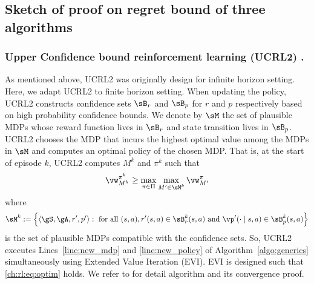 \subsection{Sketch of proof on regret bound of three algorithms}

\subsubsection{Upper Confidence bound reinforcement learning (UCRL2) \texorpdfstring{\cite{jaksch2010near}}{[JAO10]}.}
As mentioned above, UCRL2 was originally design for infinite horizon setting.
Here, we adapt UCRL2 to finite horizon setting.
When updating the policy, UCRL2 constructs confidence sets $\sB_r$ and $\sB_p$ for $r$ and $p$ respectively based on high probability confidence bounds.
We denote by $\sM$ the set of plausible MDPs whose reward function lives in $\sB_r$ and state transition lives in $\sB_p$.
UCRL2 chooses the MDP that incurs the highest optimal value among the MDPs in $\sM$ and computes an optimal policy of the chosen MDP.
That is, at the start of episode $k$, UCRL2 computes $M^k$ and $\pi^k$ such that
\begin{equation}
    \label{ch:rl:eq:optim}
    \vw_{M^k}^{\pi^k} \ge \max_{\pi\in\Pi}\max_{M'\in\sM^k} \vw_{M'}^\pi
\end{equation}
where
\begin{align*}
    \sM^k:=\Big\{\langle\gS,\gA,r',p'\rangle :
    \text{ for all }(s,a), r'(s,a)\in\sB_r^k(s,a) \text{ and } \vp'(\cdot\mid s,a)\in\sB_p^k(s,a)\Big\}
\end{align*}
is the set of plausible MDPs compatible with the confidence sets.
So, UCRL2 executes Lines~\ref{line:new_mdp} and \ref{line:new_policy} of Algorithm~\ref{algo:generics} simultaneously using Extended Value Iteration (EVI).
EVI is designed such that \eqref{ch:rl:eq:optim} holds.
We refer to \cite{jaksch2010near} for detail algorithm and its convergence proof.

